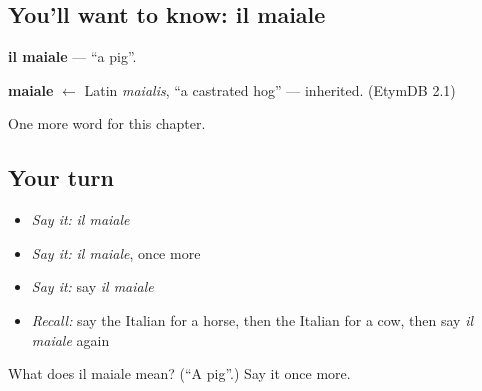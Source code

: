 \subsection*{You'll want to know: il maiale}
\textbf{il maiale} — \textquotedblleft{}a pig\textquotedblright{}.

\begin{cousinweb}
\textbf{maiale} $\leftarrow$ Latin \emph{maialis}, \textquotedblleft{}a castrated hog\textquotedblright{} — inherited. (EtymDB 2.1)
\end{cousinweb}

\begin{grammarlens}[title={What you've built}]
One more word for this chapter.
\end{grammarlens}

\subsection*{Your turn}
\begin{itemize}
\raggedright
  \item \emph{Say it:} \emph{il maiale}
  \item \emph{Say it:} \emph{il maiale}, once more
  \item \emph{Say it:} say \emph{il maiale}
  \item \emph{Recall:} say the Italian for a horse, then the Italian for a cow, then say \emph{il maiale} again
\end{itemize}

\begin{tcolorbox}[breakable,colback=teal!4,colframe=teal!35!black,title={Before you move on}]
What does il maiale mean? (\textquotedblleft{}A pig\textquotedblright{}.) Say it once more.
\end{tcolorbox}
